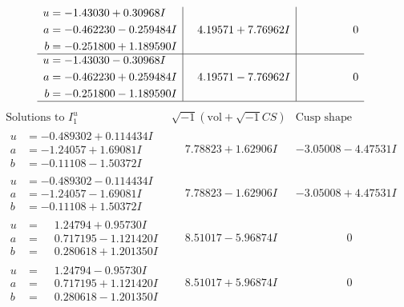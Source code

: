 \documentclass[1p]{elsarticle_modified}
\theoremstyle{definition}
\newcommand{\I}{\sqrt{-1}}
\begin{document}
$$\begin{array}{c|c|c}
\begin{aligned}
u &= -1.43030 + 0.30968 I \\
a &= -0.462230 - 0.259484 I \\
b &= -0.251800 + 1.189590 I\end{aligned}
 & \phantom{-}4.19571 + 7.76962 I & \phantom{-0.000000 } 0 \\ \hline\begin{aligned}
u &= -1.43030 - 0.30968 I \\
a &= -0.462230 + 0.259484 I \\
b &= -0.251800 - 1.189590 I\end{aligned}
 & \phantom{-}4.19571 - 7.76962 I & \phantom{-0.000000 } 0\\
 \hline 
 \end{array}$$\newpage$$\begin{array}{c|c|c}  
\text{Solutions to }I^u_{1}& \I (\text{vol} + \sqrt{-1}CS) & \text{Cusp shape}\\
 \hline 
\begin{aligned}
u &= -0.489302 + 0.114434 I \\
a &= -1.24057 + 1.69081 I \\
b &= -0.11108 - 1.50372 I\end{aligned}
 & \phantom{-}7.78823 + 1.62906 I & -3.05008 - 4.47531 I \\ \hline\begin{aligned}
u &= -0.489302 - 0.114434 I \\
a &= -1.24057 - 1.69081 I \\
b &= -0.11108 + 1.50372 I\end{aligned}
 & \phantom{-}7.78823 - 1.62906 I & -3.05008 + 4.47531 I \\ \hline\begin{aligned}
u &= \phantom{-}1.24794 + 0.95730 I \\
a &= \phantom{-}0.717195 - 1.121420 I \\
b &= \phantom{-}0.280618 + 1.201350 I\end{aligned}
 & \phantom{-}8.51017 - 5.96874 I & \phantom{-0.000000 } 0 \\ \hline\begin{aligned}
u &= \phantom{-}1.24794 - 0.95730 I \\
a &= \phantom{-}0.717195 + 1.121420 I \\
b &= \phantom{-}0.280618 - 1.201350 I\end{aligned}
 & \phantom{-}8.51017 + 5.96874 I & \phantom{-0.000000 } 0 \\ \hline\begin{aligned}

\end{aligned}
\end{array}$$
\end{document}
